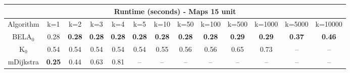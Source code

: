 \begin{tabular}{c|cccccccccccc}\toprule
\multicolumn{13}{c}{Runtime (seconds) - Maps 15 unit}\\ \midrule
Algorithm & k=1 & k=2 & k=3 & k=4 & k=5 & k=10 & k=50 & k=100 & k=500 & k=1000 & k=5000 & k=10000 \\ \midrule
BELA$_0$ & 0.28 & \textbf{0.28} & \textbf{0.28} & \textbf{0.28} & \textbf{0.28} & \textbf{0.28} & \textbf{0.28} & \textbf{0.28} & \textbf{0.29} & \textbf{0.29} & \textbf{0.37} & \textbf{0.46} \\
K$_0$ & 0.54 & 0.54 & 0.54 & 0.54 & 0.54 & 0.55 & 0.56 & 0.56 & 0.65 & 0.73 & -- & -- \\
mDijkstra & \textbf{0.25} & 0.44 & 0.63 & 0.81 & -- & -- & -- & -- & -- & -- & -- & -- \\ \bottomrule 
\end{tabular}

